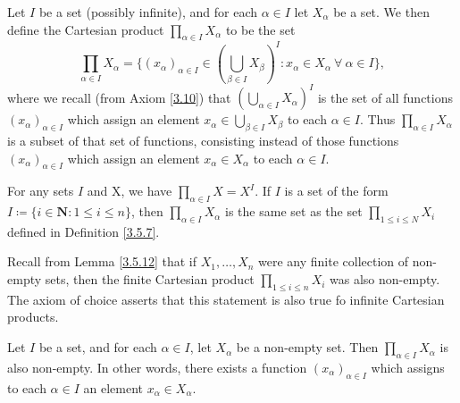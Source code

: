 \begin{definition}\label{8.4.1}
Let \(I\) be a set (possibly infinite), and for each \(\alpha \in I\) let \(X_{\alpha}\) be a set.
We then define the Cartesian product \(\prod_{\alpha \in I} X_{\alpha}\) to be the set
\[
    \prod_{\alpha \in I} X_{\alpha} = \{(x_{\alpha})_{\alpha \in I} \in (\bigcup_{\beta \in I} X_{\beta})^I : x_{\alpha} \in X_{\alpha} \ \forall\ \alpha \in I\},
\]
where we recall (from Axiom \ref{3.10}) that \((\bigcup_{\alpha \in I} X_{\alpha})^I\) is the set of all functions \((x_{\alpha})_{\alpha \in I}\) which assign an element \(x_{\alpha} \in \bigcup_{\beta \in I} X_{\beta}\) to each \(\alpha \in I\).
Thus \(\prod_{\alpha \in I} X_{\alpha}\) is a subset of that set of functions, consisting instead of those functions \((x_{\alpha})_{\alpha \in I}\) which assign an element \(x_{\alpha} \in X_{\alpha}\) to each \(\alpha \in I\).
\end{definition}

\begin{example}\label{8.4.2}
For any sets \(I\) and X, we have \(\prod_{\alpha \in I} X = X^I\).
If \(I\) is a set of the form \(I \coloneqq \{i \in \mathbf{N} : 1 \leq i \leq n\}\), then \(\prod_{\alpha \in I} X_{\alpha}\) is the same set as the set \(\prod_{1 \leq i \leq N} X_i\) defined in Definition \ref{3.5.7}.
\end{example}

\begin{note}
Recall from Lemma \ref{3.5.12} that if \(X_1, \dots, X_n\) were any finite collection of non-empty sets, then the finite Cartesian product \(\prod_{1 \leq i \leq n} X_i\) was also non-empty.
The axiom of choice asserts that this statement is also true fo infinite Cartesian products.
\end{note}

\begin{axiom}[Choice]\label{8.1}
Let \(I\) be a set, and for each \(\alpha \in I\), let \(X_{\alpha}\) be a non-empty set.
Then \(\prod_{\alpha \in I} X_{\alpha}\) is also non-empty.
In other words, there exists a function \((x_{\alpha})_{\alpha \in I}\) which assigns to each \(\alpha \in I\) an element \(x_{\alpha} \in X_{\alpha}\).
\end{axiom}

